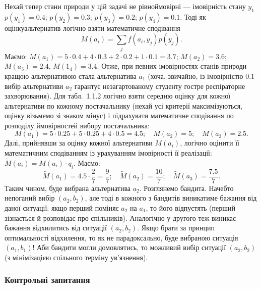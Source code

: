 \documentclass[a4paper, 12pt]{article}
\newcommand{\Sum}{\displaystyle\sum\limits}
\begin{document}
Нехай тепер стани природи у цій задачі не рівноймовірні --- імовірність стану $y_1$ $p(y_1) = 0.4$; $p(y_2) = 0.3$; $p(y_3) = 0.2$; $p(y_4) = 0.1$. Тоді як  оцінку\guillemotright альтернатив логічно взяти математичне сподівання
\[
M(a_i) = \Sum_j f(a_i, y_j) p(y_j).
\]
Маємо: $M(a_1) = 5 \cdot 0.4 + 4 \cdot 0.3 + 2 \cdot 0.2 + 1 \cdot 0.1 = 3.7$; $M(a_2) = 3.6$; $M(a_3) = 2.4$, $M(1_4) = 3.4$. Отже, при певних імовірностях станів природи кращою альтернативою стала альтернатива $a_1$ (хоча, звичайно, із імовірністю $0.1$ вибір альтернативи $a_2$ гарантує незагартованому студенту гостре респіраторне захворювання).
Для табл.~1.1.2 логічно взяти середню оцінку для кожної альтернативи по кожному постачальнику (нехай усі критерії максимізуються, оцінку \guillemotright візьмемо зі знаком мінус) і підрахувати математичне сподівання по розподілу ймовірностей вибору постачальника: 
\[
M(a_1) = 5 \cdot 0.25 + 5 \cdot 0.25 + 4 \cdot 0.5 = 4.5; \quad M(a_2) = 5; \quad M(a_3) = 2.5.
\]
Далі, прийнявши за оцінку кожної альтернативи $M(a_i)$, логічно оцінити її математичним сподіванням із урахуванням імовірності її реалізації: $\tilde M(a_i) = M(a_i) \cdot q_i$. Маємо: 
\[
\tilde M(a_1) = 4.5 \cdot \frac{2}{7} = \frac{9}{7}; \quad \tilde M(a_2) = \frac{10}{7}; \quad \tilde M(a_3) = \frac{7.5}{7}.
\]
Таким чином, буде вибрана альтернатива $a_2$. Розглянемо  бандита\guillemotright. Начебто непоганий вибір $(a_2, b_2)$, але тоді в кожного з бандитів виникатиме бажання \guillemotright від даної ситуації: якщо перший поміняє $a_2$ на $a_1$, то його відпустять (перший зізнається й розповідає про спільників). Аналогічно у другого теж виникає бажання відхилитись від ситуації $(a_2, b_2)$. Якщо брати за принцип оптимальності  відхилення\guillemotright, то як не парадоксально, буде вибраною ситуація $(a_1, b_1)$! Аби бандити могли домовлятись, то можливий вибір ситуації $(a_2, b_2)$ (з мінімізацією спільного терміну ув'язнення).

\subsubsection{Контрольні запитання}
\end{document}
